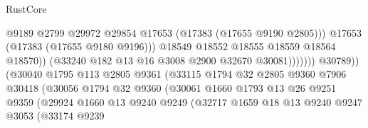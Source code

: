 \begin{lexlean}{RustCore}
\begin{coremodule}
                                                      @9189
                                                      @2799
                                                      @29972
                                                      @29854
                                                      @17653
                                                      (@17383 (@17655 @9190 @2805)))
                                                    @17653
                                                    (@17383 (@17655 @9180 @9196)))
                                                  @18549
                                                  @18552
                                                  @18555
                                                  @18559
                                                  @18564
                                                  @18570))
                                              (@33240 @182 @13 @16 @3008 @2900 @32670 @30081)))))))
                                  @30789))
                              (@30040
                                @1795
                                @113
                                @2805
                                @9361
                                (@33115
                                  @1794
                                  @32
                                  @2805
                                  @9360
                                  @7906
                                  @30418
                                  (@30056
                                    @1794
                                    @32
                                    @9360
                                    (@30061
                                      @1660
                                      @1793
                                      @13
                                      @26
                                      @9251
                                      @9359
                                      (@29924
                                        @1660
                                        @13
                                        @9240
                                        @9249
                                        (@32717
                                          @1659
                                          @18
                                          @13
                                          @9240
                                          @9247
                                          @3053
                                          (@33174
                                            @9239

\end{coremodule}
\end{lexlean}
